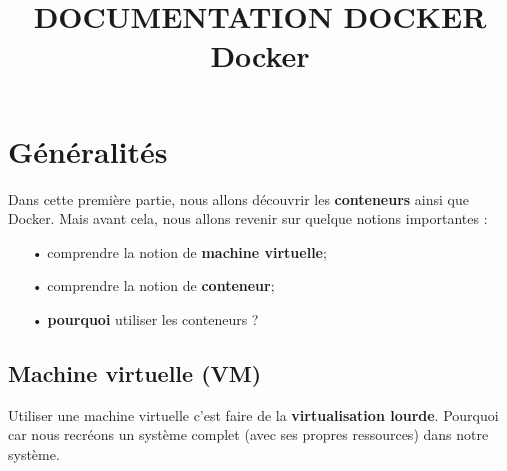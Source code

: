 \documentclass[12pt,a4paper]{article}
\title{DOCUMENTATION DOCKER \textbf{Docker}}
\begin{document}
\maketitle


\section{Généralités}
Dans cette première partie, nous allons découvrir les \textbf{conteneurs} ainsi que 
Docker. Mais avant cela, nous allons revenir sur quelque notions importantes :
\begin{itemize}
\item[•] comprendre la notion de \textbf{machine virtuelle};
\item[•] comprendre la notion de \textbf{conteneur};
\item[•] \textbf{pourquoi} utiliser les conteneurs ?
\end{itemize} 
\subsection{Machine virtuelle (VM)}
Utiliser une machine virtuelle c'est faire de la \textbf{virtualisation lourde}. Pourquoi car
nous recréons un système complet (avec ses propres ressources) dans notre système.
\end{document}
